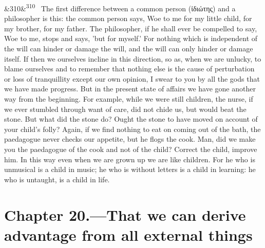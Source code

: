 \documentclass[12pt]{article}
\newcommand{\para}[1][]{\par\noindent\ifx&#1&\else\textsuperscript{\footnotesize #1}~\fi}
\begin{document}
\para[310] The first difference between a common person (ἰδιώτης) and a philosopher is this: the common person says, Woe to me for my little child, for my brother, for my father. The philosopher, if he shall ever be compelled to say, Woe to me, stops and says, 'but for myself.' For nothing which is independent of the will can hinder or damage the will, and the will can only hinder or damage itself. If then we ourselves incline in this direction, so as, when we are unlucky, to blame ourselves and to remember that nothing else is the cause of perturbation or loss of tranquillity except our own opinion, I swear to you by all the gods that we have made progress. But in the present state of affairs we have gone another way from the beginning. For example, while we were still children, the nurse, if we ever stumbled through want of care, did not chide us, but would beat the stone. But what did the stone do? Ought the stone to have moved on account of your child's folly? Again, if we find nothing to eat on coming out of the bath, the paedagogue never checks our appetite, but he flogs the cook. Man, did we make you the paedagogue of the cook and not of the child? Correct the child, improve him. In this way even when we are grown up we are like children. For he who is unmusical is a child in music; he who is without letters is a child in learning: he who is untaught, is a child in life.

\section*{Chapter 20.---That we can derive advantage from all external things}
\end{document}
